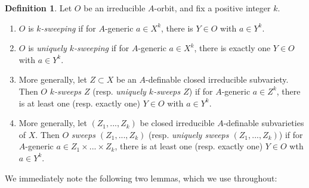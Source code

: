 \documentclass{amsart}
\theoremstyle{definition}
\newtheorem{definition}[theorem]{Definition}
\begin{document}
\begin{definition}\label{D: sweeping orbits}
    Let $O$ be an irreducible $A$-orbit, and fix a positive integer $k$.
    \begin{enumerate}
        \item $O$ is \textit{$k$-sweeping} if for $A$-generic $a\in X^k$, there is $Y\in O$ with $a\in Y^k$.
        \item $O$ is \textit{uniquely $k$-sweeping} if for $A$-generic $a\in X^k$, there is exactly one $Y\in O$ with $a\in Y^k$.
        \item More generally, let $Z\subset X$ be an $A$-definable closed irreducible subvariety. Then $O$ \textit{$k$-sweeps $Z$} (resp. \textit{uniquely $k$-sweeps $Z$}) if for $A$-generic $a\in Z^k$, there is at least one (resp. exactly one) $Y\in O$ with $a\in Y^k$.
        \item More generally, let $(Z_1,...,Z_k)$ be closed irreducible $A$-definable subvarieties of $X$. Then $O$ \textit{sweeps $(Z_1,...,Z_k)$} (resp. \textit{uniquely sweeps $(Z_1,...,Z_k)$}) if for $A$-generic $a\in Z_1\times...\times Z_k$, there is at least one (resp. exactly one) $Y\in O$ wth $a\in Y^k$.
    \end{enumerate}
\end{definition}

We immediately note the following two lemmas, which we use throughout:
\end{document}
